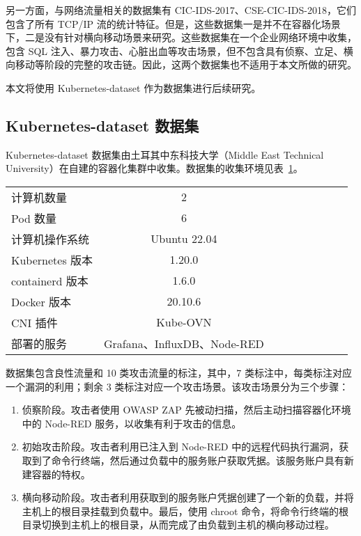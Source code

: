 {另一方面，与网络流量相关的数据集有 CIC-IDS-2017\citep{sharafaldin2018toward}、CSE-CIC-IDS-2018\citep{csecicids2018}，它们包含了所有 TCP/IP 流的统计特征。但是，这些数据集一是并不在容器化场景下，二是没有针对横向移动场景来研究。这些数据集在一个企业网络环境中收集，包含 SQL 注入、暴力攻击、心脏出血等攻击场景，但不包含具有侦察、立足、横向移动等阶段的完整的攻击链。因此，这两个数据集也不适用于本文所做的研究。

本文将使用 Kubernetes-dataset 作为数据集进行后续研究。

\subsection{Kubernetes-dataset 数据集}
\label{sec:dataset}

Kubernetes-dataset \citep{sever2023kubernetes} 数据集由土耳其中东科技大学（Middle East Technical University）在自建的容器化集群中收集。数据集的收集环境见表~\ref{tab:dataset-environment}。

\begin{table}[t]
    \label{tab:dataset-environment}
    \centering
    \footnotesize%
    \setlength{\tabcolsep}{4pt}%
    \renewcommand{\arraystretch}{1.2}%
    \begin{tabular}{lcccccccc}
        \hline
        计算机数量 & 2\\
        Pod 数量 & 6\\
        计算机操作系统 & Ubuntu 22.04\\
        Kubernetes 版本 & 1.20.0\\
        containerd 版本 & 1.6.0\\
        Docker 版本 & 20.10.6\\
        CNI 插件 & Kube-OVN\citep{kube-ovn}\\
        部署的服务 & Grafana、InfluxDB、Node-RED\\
        \hline
    \end{tabular}
\end{table}

数据集包含良性流量和 10 类攻击流量的标注，其中，7 类标注中，每类标注对应一个漏洞的利用；剩余 3 类标注对应一个攻击场景。该攻击场景分为三个步骤：

\begin{enumerate}
\item 侦察阶段。攻击者使用 OWASP ZAP\citep{zap} 先被动扫描，然后主动扫描容器化环境中的 Node-RED\citep{nodered} 服务，以收集有利于攻击的信息。
\item 初始攻击阶段。攻击者利用已注入到 Node-RED 中的远程代码执行漏洞，获取到了命令行终端，然后通过负载中的服务账户获取凭据。该服务账户具有新建容器的特权。
\item 横向移动阶段。攻击者利用获取到的服务账户凭据创建了一个新的负载，并将主机上的根目录挂载到负载中。最后，使用 chroot 命令，将命令行终端的根目录切换到主机上的根目录，从而完成了由负载到主机的横向移动过程。
\end{enumerate}

}
